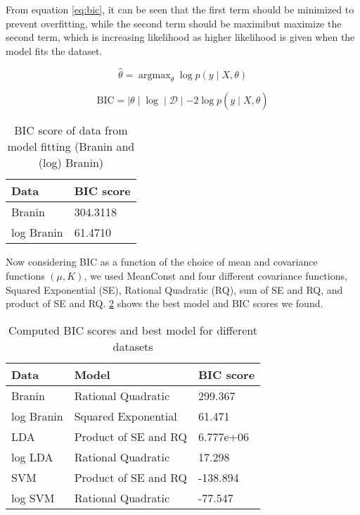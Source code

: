 \documentclass[11pt]{article}
\newcommand{\mc}[1]{\mathcal{#1}}
\newcommand{\data}{\mc{D}}
\DeclareMathOperator*{\argmax}{\arg\max}
\numberwithin{equation}{section}
\begin{document}
From equation \ref{eq:bic}, it can be seen that the first term should be minimized to prevent overfitting, while the second term should be maximibut maximize the second term, which is increasing likelihood as higher likelihood is given when the model fits the dataset.

\begin{equation}
  \hat \theta = \argmax_\theta \log p(y \mid X, \theta)
  \label{eq:hyperparameter-estimate}
\end{equation}

\begin{equation}
  \text{BIC} = \mid \theta \mid \log \mid \data \mid - 2 \log p(y \mid X, \hat \theta)
  \label{eq:bic}
\end{equation}

\begin{table}[H]
  \centering
  \begin{tabular}{| l | l |}
    \hline
    Data       & BIC score \\
    \hline
    Branin     & 304.3118  \\
    \hline
    log Branin & 61.4710   \\
    \hline
  \end{tabular}
  \caption{BIC score of data from model fitting (Branin and (log) Branin)}
  \label{tab:basic_bic}
\end{table}

Now considering BIC as a function of the choice of mean and covariance functions $(\mu, K)$, we used MeanConst and four different covariance functions, Squared Exponential (SE), Rational Quadratic (RQ), sum of SE and RQ, and product of SE and RQ. \ref{tab:bic_score} shows the best model and BIC scores we found.

\begin{table}[H]
  \centering
  \begin{tabular}{| l | l | l |}
    \hline
    Data       & Model                & BIC score \\
    \hline
    Branin     & Rational Quadratic   & 299.367   \\
    \hline
    log Branin & Squared Exponential  & 61.471    \\
    \hline
    LDA        & Product of SE and RQ & 6.777e+06 \\
    \hline
    log LDA    & Rational Quadratic   & 17.298    \\
    \hline
    SVM        & Product of SE and RQ & -138.894  \\
    \hline
    log SVM    & Rational Quadratic   & -77.547   \\
    \hline
  \end{tabular}
  \caption{Computed BIC scores and best model for different datasets}
  \label{tab:bic_score}
\end{table}
\end{document}
